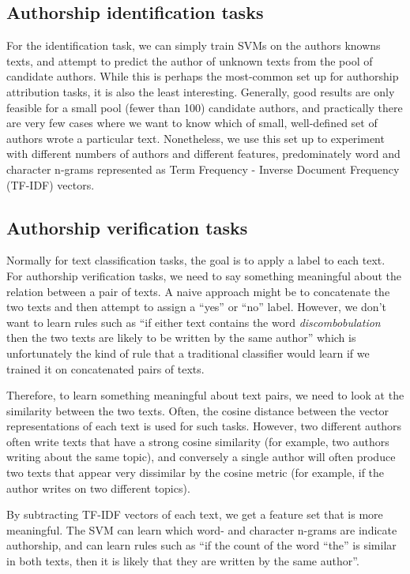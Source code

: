 \subsection{Authorship identification tasks}
\label{method:svm-aid}

For the identification task, we can simply train SVMs on the authors
knowns texts, and attempt to predict the author of unknown texts from
the pool of candidate authors. While this is perhaps the most-common set
up for authorship attribution tasks, it is also the least interesting.
Generally, good results are only feasible for a small pool (fewer than
100) candidate authors, and practically there are very few cases where
we want to know which of small, well-defined set of authors wrote a
particular text. Nonetheless, we use this set up to experiment with
different numbers of authors and different features, predominately word
and character n-grams represented as Term Frequency - Inverse Document
Frequency (TF-IDF) vectors.

\subsection{Authorship verification tasks}
\label{method:svm-av}

Normally for text classification tasks, the goal is to apply a label to
each text. For authorship verification tasks, we need to say something
meaningful about the relation between a pair of texts. A naive approach
might be to concatenate the two texts and then attempt to assign a
``yes'' or ``no'' label. However, we don't want to learn rules such as
``if either text contains the word \emph{discombobulation} then the two
texts are likely to be written by the same author'' which is
unfortunately the kind of rule that a traditional classifier would learn
if we trained it on concatenated pairs of texts.

Therefore, to learn something meaningful about text pairs, we need to
look at the similarity between the two texts. Often, the cosine distance
between the vector representations of each text is used for such tasks.
However, two different authors often write texts that have a strong
cosine similarity (for example, two authors writing about the same
topic), and conversely a single author will often produce two texts that
appear very dissimilar by the cosine metric (for example, if the author
writes on two different topics).

By subtracting TF-IDF vectors of each text, we get a feature set that
is more meaningful. The SVM can learn which word- and character n-grams
are indicate authorship, and can learn rules such as ``if the count of
the word ``the'' is similar in both texts, then it is likely that they
are written by the same author''.

